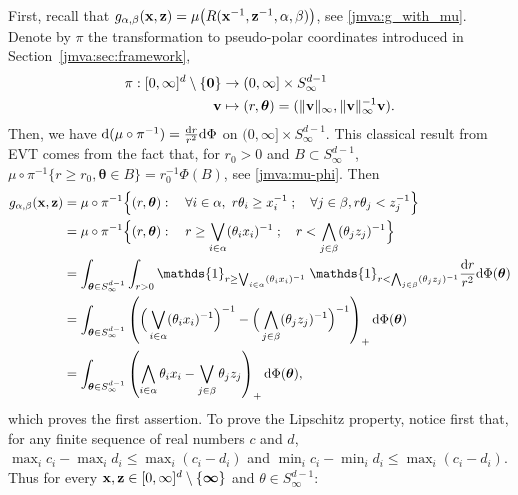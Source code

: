 First, recall that $g_{\alpha,\beta}(\mathbf x,\mathbf z) = \mu\big( R(\mathbf x^{-1},\mathbf z^{-1}, \alpha,\beta)\big)$, see \eqref{jmva:g_with_mu}. %
Denote by $\pi$ the transformation to pseudo-polar coordinates introduced
in Section~\ref{jmva:sec:framework}, 
\[
\begin{aligned}
  \pi: [0,\infty]^d \setminus\{\mathbf 0\} &\to  (0,\infty]\times S^{d-1}_\infty \\
\mathbf v & \mapsto (r,\boldsymbol{\theta}) = (\|\mathbf v\|_\infty, \|\mathbf v\|_\infty^{-1} \mathbf v). 
\end{aligned}
\]
Then, we have $\mathrm{d} (\mu \circ\pi^{-1})= \frac{\mathrm{d} r}{r^2}\mathrm{d}
\Phi$ on $(0,\infty]\times S^{d-1}_\infty$. This classical result from EVT
comes from the fact that, for $r_0>0$ and $B\subset S^{d-1}_\infty$,  $\mu\circ\pi^{-1}\{ r\ge r_0, \boldsymbol{\theta}\in B\}
= r_0^{-1}\Phi(B)$, see \eqref{jmva:mu-phi}.
Then 
\[
\begin{aligned}
 g_{\alpha,\beta}(\mb x,\mb z)  & = 
\mu\circ\pi^{-1}\Big\{(r,\boldsymbol{\theta}): \quad \forall i \in\alpha,~ r \theta_i \ge
x_i^{-1}\;; \quad \forall j \in\beta, r \theta_j < z_j^{-1} \Big\} \\
&= \mu \circ \pi^{-1} \Big\{(r,\boldsymbol{\theta}): \quad  r  \ge \bigvee_{i\in\alpha}
(\theta_ix_i)^{-1}\;; \quad  r  <\bigwedge_{j\in\beta}(\theta_j z_j)^{-1} \Big\} \\
&= \int_{\boldsymbol{\theta}\in S^{d-1}_\infty} \int_{r>0} \mathds{1}_{r  \ge \bigvee_{i\in\alpha}
(\theta_ix_i)^{-1}}\;\mathds{1}_{r  <\bigwedge_{j\in\beta}(\theta_j
z_j)^{-1}} \frac{\ud r}{r^2} \ud \Phi(\boldsymbol{\theta}) \\ 
& = \int_{\boldsymbol{\theta}\in S^{d-1}_\infty}  \left(
\Big(\bigvee_{i\in\alpha} (\theta_ix_i)^{-1}\Big)^{-1}  - 
\Big(  \bigwedge_{j\in\beta}(\theta_jz_j)^{-1} \Big)^{-1} \right)_+
\ud \Phi(\boldsymbol{\theta}) \\ 
& = \int_{\boldsymbol{\theta}\in S^{d-1}_\infty}  \left(
\bigwedge_{i\in\alpha} \theta_ix_i   - 
 \bigvee_{j\in\beta}\theta_jz_j  \right)_+ \ud \Phi(\boldsymbol{\theta}), \\ 
\end{aligned}
\]
which proves the first assertion. 
To prove the Lipschitz property, notice first that, 
for any finite sequence of real numbers  $c$ and $d$,
$\max_i c_i - \max_i d_i \le \max_i (c_i - d_i)$ and $\min_i c_i -
\min_i d_i \le \max_i (c_i - d_i)$. 
Thus for every $\mathbf x, \mathbf z \in [ 0, \infty]^d \setminus \{\boldsymbol{\infty}\}$ and $\theta \in S_\infty^{d-1}$:

